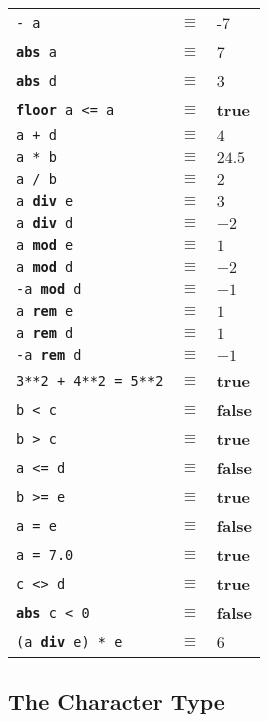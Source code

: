 \documentclass{overturerepchap}
\newcommand{\keyw}[1]{{\bf\ttfamily #1}}
\begin{document}
\begin{description}
  \begin{longtable}{lcl}
    {\tt - a}&$\equiv$& -7                     \\
    {\tt \keyw{abs} a}&$\equiv$& 7                    \\
    {\tt \keyw{abs} d}&$\equiv$& 3                    \\
    {\tt \keyw{floor} a <= a}&$\equiv$& \keyw{true}   \\
    {\tt a + d}&$\equiv$& $4$                  \\
    {\tt a * b}&$\equiv$& $24.5$               \\
    {\tt a / b}&$\equiv$& $2$                \\
    {\tt a \keyw{div} e}&$\equiv$& $3$                \\
    {\tt a \keyw{div} d}&$\equiv$& $-2$               \\
    {\tt a \keyw{mod} e}&$\equiv$& $1$                \\
    {\tt a \keyw{mod} d}&$\equiv$& $-2$               \\
    {\tt -a \keyw{mod} d}&$\equiv$& $-1$               \\
    {\tt a \keyw{rem} e}&$\equiv$& $1$                \\
    {\tt a \keyw{rem} d}&$\equiv$& $1$                \\
    {\tt -a \keyw{rem} d}&$\equiv$& $-1$              \\
    {\tt 3**2 + 4**2 = 5**2} &$\equiv$ &\keyw{true}   \\
    {\tt b < c}&$\equiv$& \keyw{false}                \\
    {\tt b > c}&$\equiv$& \keyw{true}                 \\
    {\tt a <= d}&$\equiv$& \keyw{false}               \\
    {\tt b >= e}&$\equiv$& \keyw{true}                \\
    {\tt a = e}&$\equiv$& \keyw{false}                \\
    {\tt a = 7.0}&$\equiv$& \keyw{true}               \\
    {\tt c <> d}&$\equiv$& \keyw{true}                \\
    {\tt \keyw{abs} c < 0} & $\equiv$ & \keyw{false}  \\
    {\tt (a \keyw{div} e) * e} & $\equiv$ & 6
  \end{longtable}
\end{description}

\subsection{The Character Type}
\end{document}
